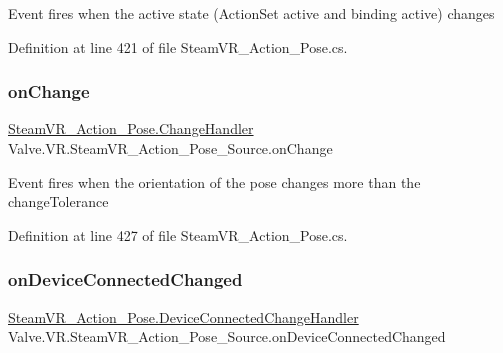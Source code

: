 Event fires when the active state (Action\+Set active and binding active) changes 



Definition at line 421 of file Steam\+V\+R\+\_\+\+Action\+\_\+\+Pose.\+cs.

\mbox{\label{class_valve_1_1_v_r_1_1_steam_v_r___action___pose___source_a471cf17f964e7592d160a27b85cf5102}} 
\subsubsection{\texorpdfstring{onChange}{onChange}}
{\footnotesize\ttfamily \mbox{\hyperlink{class_valve_1_1_v_r_1_1_steam_v_r___action___pose_ac9415e6ad971e70311f59ff1bfb4ea76}{Steam\+V\+R\+\_\+\+Action\+\_\+\+Pose.\+Change\+Handler}} Valve.\+V\+R.\+Steam\+V\+R\+\_\+\+Action\+\_\+\+Pose\+\_\+\+Source.\+on\+Change}



Event fires when the orientation of the pose changes more than the change\+Tolerance 



Definition at line 427 of file Steam\+V\+R\+\_\+\+Action\+\_\+\+Pose.\+cs.

\mbox{\label{class_valve_1_1_v_r_1_1_steam_v_r___action___pose___source_ae279d76fd9d0b7ebd1999366897cfc6e}} 
\subsubsection{\texorpdfstring{onDeviceConnectedChanged}{onDeviceConnectedChanged}}
{\footnotesize\ttfamily \mbox{\hyperlink{class_valve_1_1_v_r_1_1_steam_v_r___action___pose_a40c6d9862680e8c99781b3a109d94b82}{Steam\+V\+R\+\_\+\+Action\+\_\+\+Pose.\+Device\+Connected\+Change\+Handler}} Valve.\+V\+R.\+Steam\+V\+R\+\_\+\+Action\+\_\+\+Pose\+\_\+\+Source.\+on\+Device\+Connected\+Changed}



